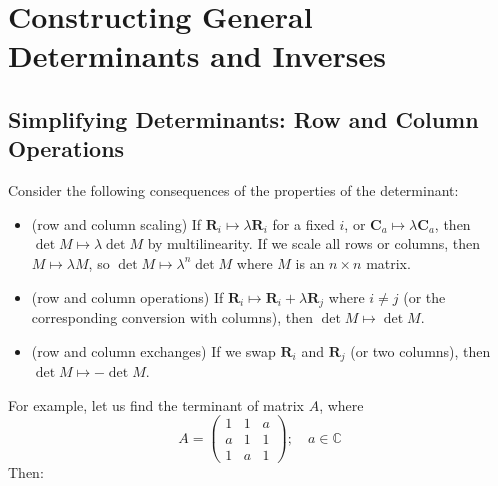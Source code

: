 \documentclass{article}
\begin{document}
\section{Constructing General Determinants and Inverses}
\subsection{Simplifying Determinants: Row and Column Operations}
Consider the following consequences of the properties of the determinant:
\begin{itemize}
	\item (row and column scaling) If $\bm R_i \mapsto \lambda \bm R_i$ for a fixed $i$, or $\bm C_a \mapsto \lambda \bm C_a$, then $\det M \mapsto \lambda \det M$ by multilinearity. If we scale all rows or columns, then $M \mapsto \lambda M$, so $\det M \mapsto \lambda^n \det M$ where $M$ is an $n \times n$ matrix.
	\item (row and column operations) If $\bm R_i \mapsto \bm R_i + \lambda \bm R_j$ where $i \neq j$ (or the corresponding conversion with columns), then $\det M \mapsto \det M$.
	\item (row and column exchanges) If we swap $\bm R_i$ and $\bm R_j$ (or two columns), then $\det M \mapsto -\det M$.
\end{itemize}
For example, let us find the terminant of matrix $A$, where
\[ A = \begin{pmatrix}
		1 & 1 & a \\ a & 1 & 1 \\ 1 & a & 1
	\end{pmatrix};\quad a \in \mathbb C \]
Then:
\end{document}
